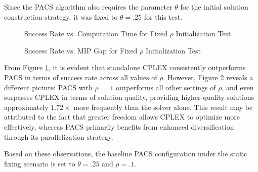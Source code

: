 Since the PACS algorithm also requires the parameter $\theta$ for the initial solution construction strategy, it was fixed to $\theta = .25$ for this test.  

\begin{figure}[H]
    \centering
    \begin{minipage}{0.6\columnwidth}
        \centering
        \resizebox{\linewidth}{!}{}
    \end{minipage}%
    \hfill
    \begin{minipage}{0.4\columnwidth}
        \centering
        \resizebox{\linewidth}{!}{}
    \end{minipage}
    \caption{Success Rate vs. Computation Time for Fixed $\rho$ Initialization Test}
    \label{fig:PACS_STD_SuccRate}
\end{figure}

\begin{figure}[H]
    \centering
    \begin{minipage}{0.6\columnwidth}
        \centering
        \resizebox{\linewidth}{!}{}
    \end{minipage}%
    \hfill
    \begin{minipage}{0.4\columnwidth}
        \centering
        \resizebox{\linewidth}{!}{}
    \end{minipage}
    \caption{Success Rate vs. MIP Gap for Fixed $\rho$ Initialization Test}
    \label{fig:PACS_STD_MGAP}
\end{figure}
From Figure \ref{fig:PACS_STD_SuccRate}, it is evident that standalone CPLEX consistently outperforms PACS in terms of success rate across all values of $\rho$.  
However, Figure \ref{fig:PACS_STD_MGAP} reveals a different picture: PACS with $\rho = .1$ outperforms all other settings of $\rho$, and even surpasses CPLEX in terms of solution quality, providing higher-quality solutions approximately $1.72\times$ more frequently than the solver alone.
This result may be attributed to the fact that greater freedom allows CPLEX to optimize more effectively, whereas PACS primarily benefits from enhanced diversification through its parallelization strategy.

Based on these observations, the baseline PACS configuration under the static fixing scenario is set to $\theta = .25$ and $\rho = .1$.

